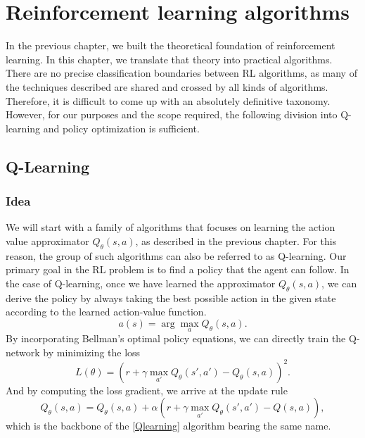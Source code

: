 \chapter{Reinforcement learning algorithms}

In the previous chapter, we built the theoretical foundation of reinforcement learning.
In this chapter, we translate that theory into practical algorithms.
There are no precise classification boundaries between RL algorithms, as many of the techniques described are shared and crossed by all kinds of algorithms.
Therefore, it is difficult to come up with an absolutely definitive taxonomy.
However, for our purposes and the scope required, the following division into Q-learning and policy optimization is sufficient.

\section{Q-Learning}

\subsection*{Idea}
We will start with a family of algorithms that focuses on learning the action value approximator $Q_\theta(s,a)$, as described in the previous chapter.
For this reason, the group of such algorithms can also be referred to as Q-learning.
Our primary goal in the RL problem is to find a policy that the agent can follow.
In the case of Q-learning, once we have learned the approximator $Q_\theta(s,a)$, we can derive the policy by always taking the best possible action in the given state according to the learned action-value function.
\[a(s) = \arg \max_a Q_\theta(s,a).\]
By incorporating Bellman's optimal policy equations, we can directly train the Q-network by minimizing the loss
\[L(\theta)=(r + \gamma \max_{a'} Q_\theta(s',a') - Q_\theta(s,a))^2.\]
And by computing the loss gradient, we arrive at the update rule
\[Q_\theta(s,a) = Q_\theta(s,a) + \alpha (r + \gamma \max_{a'}Q_\theta(s',a') - Q(s,a)),\]
which is the backbone of the \ref*{Qlearning} algorithm bearing the same name.
